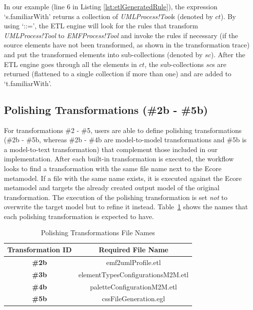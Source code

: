 
In our example (line 6 in Listing \ref{lst:etlGeneratedRule}), the expression `s.familiarWith' returns a collection of \emph{UMLProcess!Tool}s (denoted by $ct$). By using `::=', the ETL engine will look for the rules that transform \emph{UMLProcess!Tool} to \emph{EMFProcess!Tool} and invoke the rules if 
necessary (if the source elements have not been transformed, as shown in the transformation trace) and put the transformed elements into sub-collections 
(denoted by $sc$). 
After the ETL engine goes through all the elements in $ct$, the sub-collections $sc$s are returned (flattened to a single collection if more than one) and are added to `t.familiarWith'.


\vspace{5mm}
\subsection{Polishing Transformations (\#2b - \#5b)} 
\label{sec:transformationPatches}

For transformations \#2 - \#5, users are able to define polishing transformations (\#2b - \#5b, whereas \#2b - \#4b are model-to-model transformations and \#5b is a model-to-text transformation) that complement those included in our implementation. 
After each built-in transformation is executed, the workflow looks to find a transformation with the same file name next to the Ecore metamodel. 
If a file with the same name exists, it is executed against the Ecore metamodel and targets the already created output model of the original transformation. 
The execution of the polishing transformation is set \textit{not} to overwrite the target model but to refine it instead.
Table~\ref{tab:polishingTransformationsNames} shows the names that each polishing transformation is expected to have.

\begin{table}[ht!]
	\centering
	\begin{tabular}{|c|c|}
		\cline{1-2}
		\textbf{Transformation ID}  & \textbf{Required File Name}\\ \hline
		\textbf{\#2b} & emf2umlProfile.etl\\ \hline
		\textbf{\#3b} & elementTypesConfigurationsM2M.etl\\ \hline
		\textbf{\#4b} & paletteConfigurationM2M.etl\\ \hline
		\textbf{\#5b} & cssFileGeneration.egl\\ \hline
		\cline{1-2}
	\end{tabular}
	\caption{Polishing Transformations File Names}
	\label{tab:polishingTransformationsNames}
\end{table}



